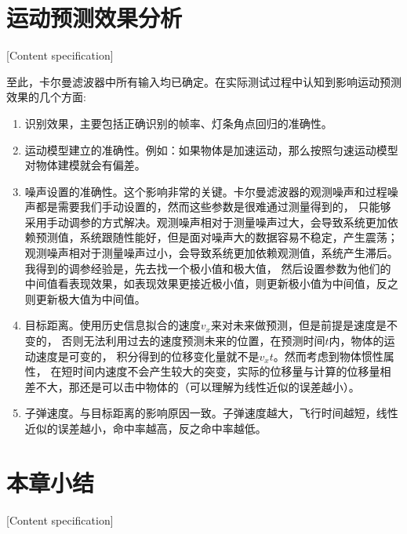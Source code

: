 



\section{运动预测效果分析}[Content specification]

至此，卡尔曼滤波器中所有输入均已确定。在实际测试过程中认知到影响运动预测效果的几个方面:
\begin{enumerate}[itemsep=2pt,topsep=0pt,parsep=0pt]
    \item 识别效果，主要包括正确识别的帧率、灯条角点回归的准确性。
    \item 运动模型建立的准确性。例如：如果物体是加速运动，那么按照匀速运动模型对物体建模就会有偏差。
    \item 噪声设置的准确性。这个影响非常的关键。卡尔曼滤波器的观测噪声和过程噪声都是需要我们手动设置的，然而这些参数是很难通过测量得到的，
    只能够采用手动调参的方式解决。观测噪声相对于测量噪声过大，会导致系统更加依赖预测值，系统跟随性能好，但是面对噪声大的数据容易不稳定，产生震荡；
    观测噪声相对于测量噪声过小，会导致系统更加依赖观测值，系统产生滞后。我得到的调参经验是，先去找一个极小值和极大值，
    然后设置参数为他们的中间值看表现效果，如表现效果更接近极小值，则更新极小值为中间值，反之则更新极大值为中间值。
    \item 目标距离。使用历史信息拟合的速度$v_x$来对未来做预测，但是前提是速度是不变的，
    否则无法利用过去的速度预测未来的位置，在预测时间$t$内，物体的运动速度是可变的，
    积分得到的位移变化量就不是$v_xt$。然而考虑到物体惯性属性，
    在短时间内速度不会产生较大的突变，实际的位移量与计算的位移量相差不大，那还是可以击中物体的（可以理解为线性近似的误差越小）。
    \item 子弹速度。与目标距离的影响原因一致。子弹速度越大，飞行时间越短，线性近似的误差越小，命中率越高，反之命中率越低。

\end{enumerate}

\section{本章小结}[Content specification]

